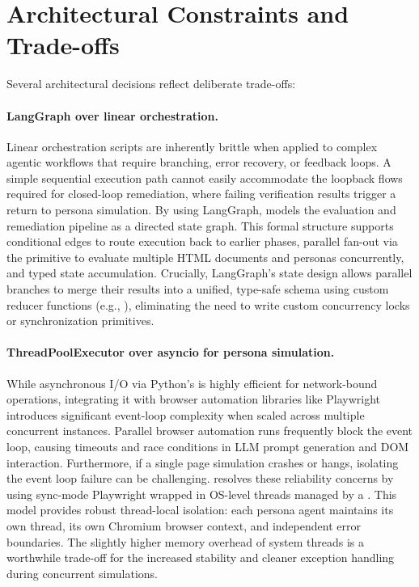 \section{Architectural Constraints and Trade-offs}
\label{sec:trade-offs}

Several architectural decisions reflect deliberate trade-offs:

\paragraph{LangGraph over linear orchestration.}
Linear orchestration scripts are inherently brittle when applied to complex agentic workflows that require branching, error recovery, or feedback loops. A simple sequential execution path cannot easily accommodate the loopback flows required for closed-loop remediation, where failing verification results trigger a return to persona simulation. By using LangGraph, \versimux{} models the evaluation and remediation pipeline as a directed state graph. This formal structure supports conditional edges to route execution back to earlier phases, parallel fan-out via the  primitive to evaluate multiple HTML documents and personas concurrently, and typed state accumulation. Crucially, LangGraph's state design allows parallel branches to merge their results into a unified, type-safe schema using custom reducer functions (e.g., ), eliminating the need to write custom concurrency locks or synchronization primitives.

\paragraph{ThreadPoolExecutor over asyncio for persona simulation.}
While asynchronous I/O via Python's  is highly efficient for network-bound operations, integrating it with browser automation libraries like Playwright introduces significant event-loop complexity when scaled across multiple concurrent instances. Parallel browser automation runs frequently block the event loop, causing timeouts and race conditions in LLM prompt generation and DOM interaction. Furthermore, if a single page simulation crashes or hangs, isolating the event loop failure can be challenging. \versimux{} resolves these reliability concerns by using sync-mode Playwright wrapped in OS-level threads managed by a . This model provides robust thread-local isolation: each persona agent maintains its own thread, its own Chromium browser context, and independent error boundaries. The slightly higher memory overhead of system threads is a worthwhile trade-off for the increased stability and cleaner exception handling during concurrent simulations.

